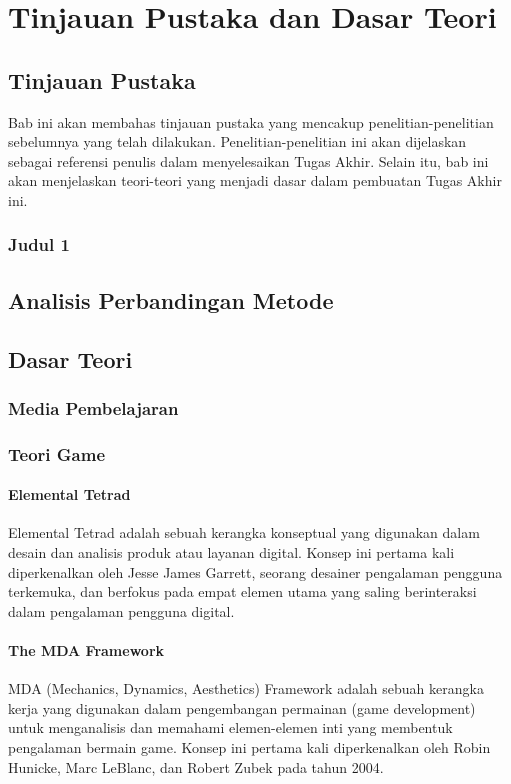 \chapter{Tinjauan Pustaka dan Dasar Teori}

\section{Tinjauan Pustaka}
Bab ini akan membahas tinjauan pustaka yang mencakup penelitian-penelitian sebelumnya yang telah dilakukan.
Penelitian-penelitian ini akan dijelaskan sebagai referensi penulis dalam menyelesaikan Tugas Akhir.
Selain itu, bab ini akan menjelaskan teori-teori yang menjadi dasar dalam pembuatan Tugas Akhir ini.
\subsection{Judul 1}
\section{Analisis Perbandingan Metode}
\section{Dasar Teori}
\subsection{Media Pembelajaran}
\subsection{Teori Game}
\subsubsection{Elemental Tetrad}
Elemental Tetrad adalah sebuah kerangka konseptual yang digunakan dalam desain dan analisis produk atau layanan digital. 
Konsep ini pertama kali diperkenalkan oleh Jesse James Garrett, seorang desainer pengalaman pengguna terkemuka, 
dan berfokus pada empat elemen utama yang saling berinteraksi dalam pengalaman pengguna digital.

\subsubsection{The MDA Framework}
MDA (Mechanics, Dynamics, Aesthetics) Framework adalah sebuah kerangka kerja yang digunakan dalam pengembangan permainan
(game development) untuk menganalisis dan memahami elemen-elemen inti yang membentuk pengalaman bermain game. 
Konsep ini pertama kali diperkenalkan oleh Robin Hunicke, Marc LeBlanc, dan Robert Zubek pada tahun 2004.
